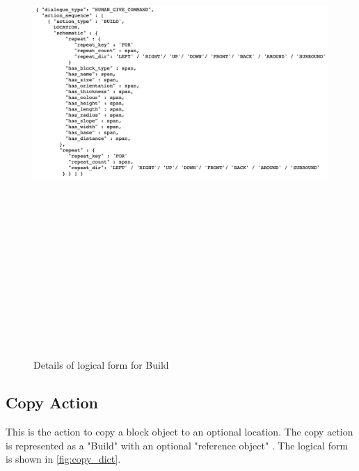 \begin{figure}[h]
    \centering
    \includegraphics[width=15cm,height=20cm,keepaspectratio]{figures/build.png}
    \caption{Details of logical form for Build}
    \label{fig:build_dict}
\end{figure}

\subsection{Copy Action}
This is the action to copy a block object to an optional location. The copy action is represented as a "Build" with an optional "reference object" . The logical form  is shown in \ref{fig:copy_dict}.

